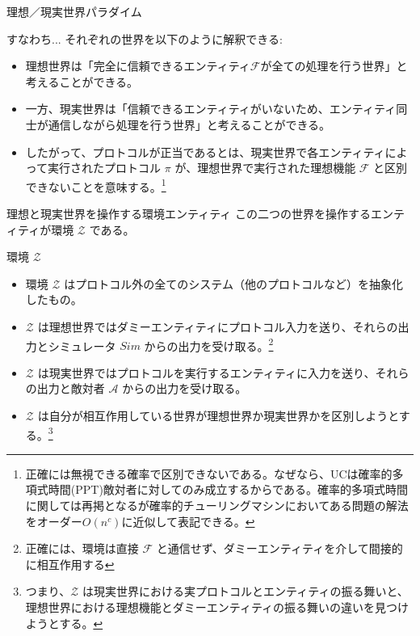 \documentclass[aspectratio=169,10pt]{beamer}
\newenvironment{proofblock}[1][]
{\begin{block}{#1}\vspace{0.5em}}
{\vspace{0.5em}\end{block}}
\newenvironment{outlineblock}[1][]
{\begin{tcolorbox}[colframe=black, colback=white, boxrule=1pt, boxsep=5pt]}
{\end{tcolorbox}}
\begin{document}
\begin{frame}{理想／現実世界パラダイム}
  \begin{outlineblock}{}
    すなわち... それぞれの世界を以下のように解釈できる:
    \begin{itemize}
        \item 理想世界は「完全に信頼できるエンティティ$\mathcal{F}$が全ての処理を行う世界」と考えることができる。
        \item 一方、現実世界は「信頼できるエンティティがいないため、エンティティ同士が通信しながら処理を行う世界」と考えることができる。
        \item したがって、プロトコルが正当であるとは、現実世界で各エンティティによって実行されたプロトコル $\pi$ が、理想世界で実行された理想機能 $\mathcal{F}$ と区別できないことを意味する。\footnote{正確には無視できる確率で区別できないである。なぜなら、UCは確率的多項式時間(PPT)敵対者に対してのみ成立するからである。確率的多項式時間に関しては再掲となるが確率的チューリングマシンにおいてある問題の解法をオーダー$O(n^c)$に近似して表記できる。}
    \end{itemize}
  \end{outlineblock}
\end{frame}


\begin{frame}{理想と現実世界を操作する環境エンティティ}
    この二つの世界を操作するエンティティが環境 $\mathcal{Z}$ である。
    \begin{proofblock}[環境 $\mathcal{Z}$]
    \begin{itemize}
      \item 環境 $\mathcal{Z}$ はプロトコル外の全てのシステム（他のプロトコルなど）を抽象化したもの。
      \item $\mathcal{Z}$ は理想世界ではダミーエンティティにプロトコル入力を送り、それらの出力とシミュレータ $Sim$ からの出力を受け取る。\footnote{正確には、環境は直接 $\mathcal{F}$ と通信せず、ダミーエンティティを介して間接的に相互作用する}
      \item $\mathcal{Z}$ は現実世界ではプロトコルを実行するエンティティに入力を送り、それらの出力と敵対者 $\mathcal{A}$ からの出力を受け取る。
      \item $\mathcal{Z}$ は自分が相互作用している世界が理想世界か現実世界かを区別しようとする。\footnote{つまり、$\mathcal{Z}$ は現実世界における実プロトコルとエンティティの振る舞いと、理想世界における理想機能とダミーエンティティの振る舞いの違いを見つけようとする。}
    \end{itemize}
  \end{proofblock}
\end{frame}
\end{document}
